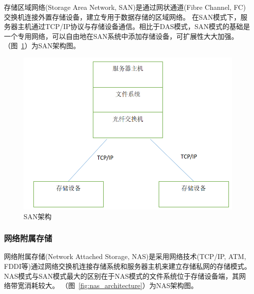 存储区域网络(Storage Area Network, SAN)是通过网状通道(Fibre Channel, FC)交换机连接外置存储设备，建立专用于数据存储的区域网络。
在SAN模式下，服务器主机通过TCP/IP协议与存储设备通信。相比于DAS模式，SAN模式的基础是一个专用网络，可以自由地在SAN系统中添加存储设备，可扩展性大大加强。
（图~\ref{fig:san_architecture}）为SAN架构图。

\begin{figure}
\centering
\includegraphics[scale=0.45]{Figures/storage/san_architecture.jpg}
\decoRule
\caption{SAN架构}
\label{fig:san_architecture}
\end{figure}

\subsubsection{网络附属存储}

网络附属存储(Network Attached Storage, NAS)是采用网络技术(TCP/IP, ATM, FDDI等)通过网络交换机连接存储系统和服务器主机来建立存储私网的存储模式。
NAS模式与SAN模式最大的区别在于NAS模式的文件系统位于存储设备端，其网络带宽消耗较大。
（图~\ref{fig:nas_architecture}）为NAS架构图。

